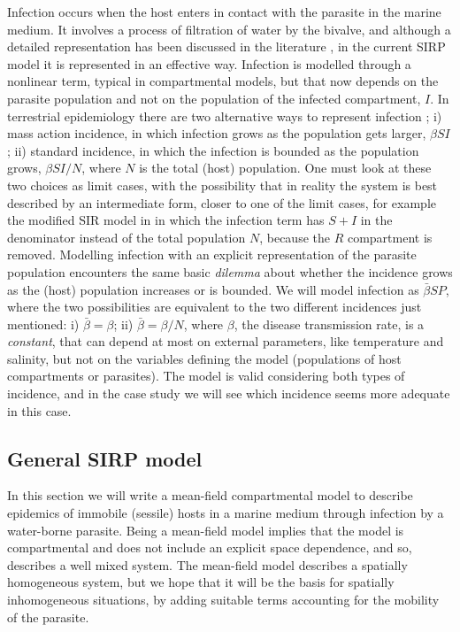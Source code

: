 Infection occurs when the host enters in contact with the parasite in the
marine medium. It involves a process of filtration of water by the bivalve, and
although a detailed representation has been discussed in the literature
\cite{BIDEGAIN_2016_2}, in the current SIRP model it is represented in an
effective way.
Infection is modelled through a nonlinear term, typical in compartmental
models,
but that now depends on the parasite population and not on the population of
the infected compartment, $I$. In terrestrial epidemiology there are two
alternative ways to represent infection \cite{MartchevaBook}; i) mass action
incidence, in which infection grows as the population gets larger, $\beta S I$;
ii) standard incidence, in which the infection is bounded as the population
grows, $\beta S I/N$, where $N$ is the total (host) population. One must look
at these two choices as limit cases, with the possibility that in reality the
system is best described by an intermediate form, closer to one of the limit
cases, for example the modified SIR model in \cite{Brauer1990} in which the
infection term has $S+I$ in the denominator instead of the total population
$N$, because the $R$ compartment is removed.
Modelling infection with an explicit representation of the parasite population
encounters the same basic \textit{dilemma} about whether the incidence grows as
the (host) population increases or is bounded. We will model infection as
$\bar{\beta} S P$, where the two possibilities are equivalent to the two
different incidences just mentioned: i) $\bar{\beta}=\beta$; ii)
$\bar{\beta}=\beta/N$, where $\beta$, the disease transmission rate, is a
\textit{constant}, that can depend at most on external parameters, like
temperature and salinity, but not on the variables defining the model
(populations of host compartments or parasites). The model is valid considering
both types of incidence, and in the case study we will see which incidence
seems more adequate in this case.

\subsection{General SIRP model} \label{subsec:SIRPmodel}

In this section we will write a mean-field compartmental model to describe
epidemics of immobile (sessile) hosts in a marine medium through infection by a
water-borne parasite. Being a mean-field model implies that the model is
compartmental and does not include an explicit space dependence, and so,
describes a well mixed system. The mean-field model describes a spatially
homogeneous system, but we hope that it will be the basis for spatially
inhomogeneous situations, by adding suitable terms accounting for the mobility
of the parasite.

